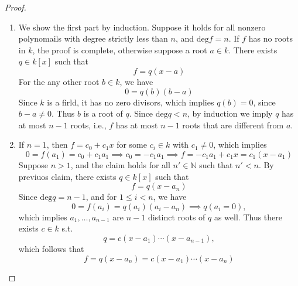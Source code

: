 \begin{proof}
\begin{enumerate}
\item
We show the first part by induction. Suppose it holds for all nonzero polynomails with degree strictly less than $n$, and $\mbox{deg}f=n$. If $f$ has no roots in $k$, the proof is complete, otherwise suppose a root $a\in k$. There exists $q\in k[x]$ such that
\[
f=q(x-a)
\]
For the any other root $b\in k$, we have 
\[
0=q(b)(b-a)
\]
Since $k$ is a firld, it has no zero divisors, which implies $q(b)=0$, since $b-a\ne0$. Thus $b$ is a root of $q$. Since $\mbox{deg}q<n$, by induction we imply $q$ has at most $n-1$ roots, i.e., $f$ has at most $n-1$ roots that are different from $a$.
\item
If $n=1$, then $f=c_0+c_1x$ for some $c_i\in k$ with $c_1\ne0$, which implies
\[
0=f(a_1)=c_0+c_1a_1\implies c_0=-c_1a_1\implies
f=-c_1a_1+c_1x=c_1(x-a_1)
\]
Suppose $n>1$, and the claim holds for all $n'\in\mathbb{N}$ such that $n'<n$. By previuos claim, there exists $q\in k[x]$ such that
\[
f=q(x-a_n)
\]
Since $\mbox{deg}q=n-1$, and for $1\le i<n$, we have
\[
0=f(a_i)=q(a_i)(a_i-a_n)\implies q(a_i=0),
\]
which implies $a_1,\dots,a_{n-1}$ are $n-1$ distinct roots of $q$ as well. Thus there exists $c\in k$ s.t.
\[
q=c(x-a_1)\cdots(x-a_{n-1}),
\]
which follows that
\[
f=q(x-a_n)=c(x-a_1)\cdots(x-a_n)
\]
\end{enumerate}
\end{proof}

